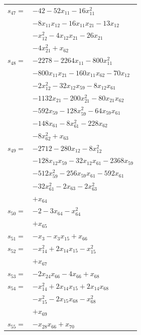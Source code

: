 \begin{longtable}{@{}r@{\;}l@{}}
\(s_{47}=\) & \(\displaystyle -42 -52x_{11} -16x_{11}^{2}\) \\
 & \(\displaystyle -8x_{11}x_{12} -16x_{11}x_{21} -13x_{12}\) \\
 & \(\displaystyle -x_{12}^{2} -4x_{12}x_{21} -26x_{21}\) \\
 & \(\displaystyle -4x_{21}^{2} +x_{62}\) \\[3pt]
\(s_{48}=\) & \(\displaystyle -2278 -2264x_{11} -800x_{11}^{2}\) \\
 & \(\displaystyle -800x_{11}x_{21} -160x_{11}x_{62} -70x_{12}\) \\
 & \(\displaystyle -2x_{12}^{2} -32x_{12}x_{59} -8x_{12}x_{61}\) \\
 & \(\displaystyle -1132x_{21} -200x_{21}^{2} -80x_{21}x_{62}\) \\
 & \(\displaystyle -592x_{59} -128x_{59}^{2} -64x_{59}x_{61}\) \\
 & \(\displaystyle -148x_{61} -8x_{61}^{2} -228x_{62}\) \\
 & \(\displaystyle -8x_{62}^{2} +x_{63}\) \\[3pt]
\(s_{49}=\) & \(\displaystyle -2712 -280x_{12} -8x_{12}^{2}\) \\
 & \(\displaystyle -128x_{12}x_{59} -32x_{12}x_{61} -2368x_{59}\) \\
 & \(\displaystyle -512x_{59}^{2} -256x_{59}x_{61} -592x_{61}\) \\
 & \(\displaystyle -32x_{61}^{2} -2x_{63} -2x_{63}^{2}\) \\
 & \(\displaystyle +x_{64}\) \\[3pt]
\(s_{50}=\) & \(\displaystyle -2 -3x_{64} -x_{64}^{2}\) \\
 & \(\displaystyle +x_{65}\) \\[3pt]
\(s_{51}=\) & \(\displaystyle -x_{3} -x_{3}x_{15} +x_{66}\) \\[3pt]
\(s_{52}=\) & \(\displaystyle -x_{14}^{2} +2x_{14}x_{15} -x_{15}^{2}\) \\
 & \(\displaystyle +x_{67}\) \\[3pt]
\(s_{53}=\) & \(\displaystyle -2x_{24}x_{66} -4x_{66} +x_{68}\) \\[3pt]
\(s_{54}=\) & \(\displaystyle -x_{14}^{2} +2x_{14}x_{15} +2x_{14}x_{68}\) \\
 & \(\displaystyle -x_{15}^{2} -2x_{15}x_{68} -x_{68}^{2}\) \\
 & \(\displaystyle +x_{69}\) \\[3pt]
\(s_{55}=\) & \(\displaystyle -x_{28}x_{66} +x_{70}\) \\[3pt]

\end{longtable}
